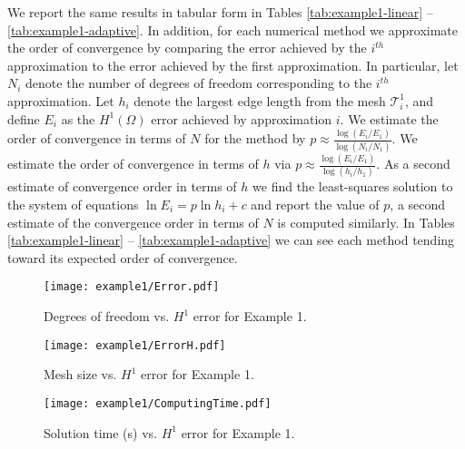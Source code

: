 \documentclass{article}
\newcommand{\T}{\mathcal{T}}
\begin{document}
We report the same results in tabular form in Tables
\ref{tab:example1-linear} -- \ref{tab:example1-adaptive}.  In
addition, for each numerical method we
approximate the order of convergence by comparing the error achieved
by the $i^{th}$ approximation to the error achieved by the first
approximation.  In particular, let $N_i$ denote the number of degrees of
freedom corresponding to the $i^{th}$ approximation. Let $h_i$ denote the
largest edge length from the mesh $\T^1_i$, and define $E_i$ as the
$H^1(\Omega)$ error achieved by approximation $i$. We estimate the
order of convergence in terms of $N$ for the method by $p\approx
\frac{\log(E_i/E_1)}{\log(N_i/N_1)}$. We estimate the order of
convergence in terms of $h$ via $p\approx
\frac{\log(E_i/E_1)}{\log(h_i/h_1)}$.  As a second  estimate of
convergence order in terms of $h$ we find the least-squares solution
to the system of equations $\ln E_i=p\ln h_i +c$ and report the value
of $p$, a second estimate of the convergence order in terms of $N$ is
computed similarly. 
In Tables
\ref{tab:example1-linear} -- \ref{tab:example1-adaptive} we can see
each method tending toward its expected order of convergence. 


\begin{figure}
\texttt{[image: example1/Error.pdf]}
\caption{Degrees of freedom vs. $H^1$ error for Example 1.}
\label{fig:example1-error}
\end{figure}

\begin{figure}
\texttt{[image: example1/ErrorH.pdf]}
\caption{Mesh size vs. $H^1$ error for Example 1.}
\label{fig:example1-herror}
\end{figure}


\begin{figure}
\texttt{[image: example1/ComputingTime.pdf]}
\caption{Solution time (s) vs. $H^1$ error for Example 1.}
\label{fig:example1-time}
\end{figure}
\end{document}
